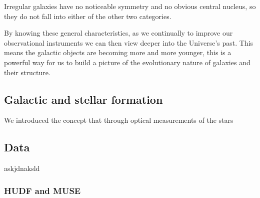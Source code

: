 \documentclass[12pt, onecolumn]{revtex4}    %
\begin{document}
Irregular galaxies have no noticeable symmetry and no obvious central nucleus, so they do not fall into either of the other two categories.





By knowing these general characteristics, as we continually to improve our observational instruments we can then view deeper into the Universe's past. This means the galactic objects are becoming more and more younger, this is a powerful way for us to build a picture of the evolutionary nature of galaxies and their structure. 

\subsection{Galactic and stellar formation}


We introduced the concept that through optical measurements of the stars 


\subsection{Data} 

askjdnaksld

\subsubsection{HUDF and MUSE}
\end{document}
